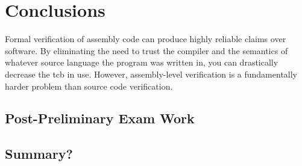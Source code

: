 \chapter{Conclusions}\label{ch:conclusions}
Formal verification of assembly code can produce highly reliable claims over software.
By eliminating the need to trust the compiler
and the semantics of whatever source language the program was written in,
you can drastically decrease the \ac{tcb} in use.
However, assembly-level verification is a fundamentally harder problem
than source code verification.


\section{Post-Preliminary Exam Work}
\section{Summary?}
